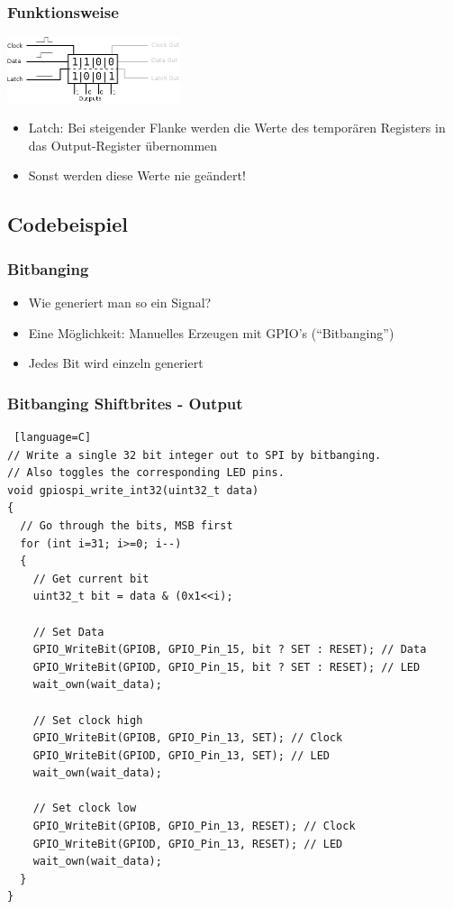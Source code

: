 \documentclass[ngerman,compress]{beamer}
\begin{document}
\begin{frame} [fragile]
	\frametitle{Funktionsweise}
	\includegraphics[width=2in]{07_shift.png}
	\begin{itemize}
		\item Latch: Bei steigender Flanke werden die Werte des temporären Registers in das
			Output-Register übernommen
		\item Sonst werden diese Werte nie geändert!
	\end{itemize}
\end{frame}


\subsection{Codebeispiel}

\begin{frame} [fragile]
	\frametitle{Bitbanging}
	\begin{itemize}
		\item Wie generiert man so ein Signal?
		\item Eine Möglichkeit: Manuelles Erzeugen mit GPIO's (``Bitbanging'')
		\item Jedes Bit wird einzeln generiert
	\end{itemize}
\end{frame}

\begin{frame} [fragile]
	\frametitle{Bitbanging Shiftbrites - Output}
	\begin{lstlisting} [language=C]
// Write a single 32 bit integer out to SPI by bitbanging.
// Also toggles the corresponding LED pins.
void gpiospi_write_int32(uint32_t data)
{
  // Go through the bits, MSB first
  for (int i=31; i>=0; i--)
  {
    // Get current bit
    uint32_t bit = data & (0x1<<i);

    // Set Data
    GPIO_WriteBit(GPIOB, GPIO_Pin_15, bit ? SET : RESET); // Data
    GPIO_WriteBit(GPIOD, GPIO_Pin_15, bit ? SET : RESET); // LED
    wait_own(wait_data);

    // Set clock high
    GPIO_WriteBit(GPIOB, GPIO_Pin_13, SET); // Clock
    GPIO_WriteBit(GPIOD, GPIO_Pin_13, SET); // LED
    wait_own(wait_data);

    // Set clock low
    GPIO_WriteBit(GPIOB, GPIO_Pin_13, RESET); // Clock
    GPIO_WriteBit(GPIOD, GPIO_Pin_13, RESET); // LED
    wait_own(wait_data);
  }
}
	\end{lstlisting}
\end{frame}
\end{document}
